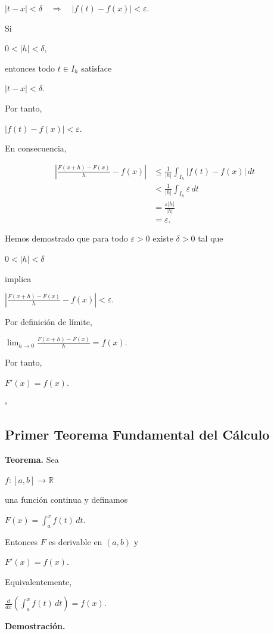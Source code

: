 \documentclass[12pt]{article}
\begin{document}
$
|t-x|<\delta
\quad\Longrightarrow\quad
|f(t)-f(x)|<\varepsilon.
$

Si

$
0<|h|<\delta,
$

entonces todo $t\in I_h$ satisface

$
|t-x|<\delta.
$

Por tanto,

$
|f(t)-f(x)|<\varepsilon.
$

En consecuencia,

\begin{align*}
\left|
\frac{F(x+h)-F(x)}{h}-f(x)
\right|
&\leq
\frac{1}{|h|}
\int_{I_h}|f(t)-f(x)|\,dt\\
&<
\frac{1}{|h|}
\int_{I_h}\varepsilon\,dt\\
&=
\frac{\varepsilon |h|}{|h|}\\
&=
\varepsilon.
\end{align*}

Hemos demostrado que para todo $\varepsilon>0$ existe $\delta>0$ tal que

$
0<|h|<\delta
$

implica

$
\left|
\frac{F(x+h)-F(x)}{h}-f(x)
\right|
<\varepsilon.
$

Por definición de límite,

$
\lim_{h\to0}
\frac{F(x+h)-F(x)}{h}
=
f(x).
$

Por tanto,

$
\boxed{
F'(x)=f(x).
}
$

\hfill$\square$
\subsection*{Primer Teorema Fundamental del Cálculo}

\textbf{Teorema.}
Sea

$
f:[a,b]\longrightarrow\mathbb{R}
$

una función continua y definamos

$
F(x)=\int_a^x f(t)\,dt.
$

Entonces $F$ es derivable en $(a,b)$ y

$
\boxed{
F'(x)=f(x).
}
$

Equivalentemente,

$
\boxed{
\frac{d}{dx}
\left(
\int_a^x f(t)\,dt
\right)
=
f(x).
}
$

\textbf{Demostración.}
\end{document}
